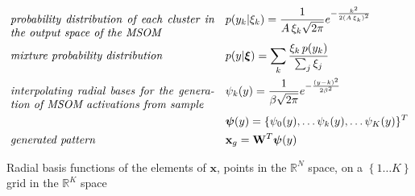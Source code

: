 \documentclass[a4paper]{article}
\begin{document}
\begin{align}
	& \emph{\parbox[t]{2.5in}{probability distribution of 
    each cluster in the output space of the MSOM}} && 
    p(y_k|\xi_k) = \frac{1}{A\,\xi_k\sqrt{2\pi}} 
    e^{-\frac{k^2}{2(A\,\xi_k)^2}}\nonumber\\
    & \emph{mixture probability distribution} && 
    p(y|\boldsymbol{\xi}) = \sum_k \frac{\xi_k\, p(y_k)}
    {\sum_j\xi_j}\nonumber\\
    & \emph{\parbox[t]{2.5in}{interpolating radial bases
    for the generation of MSOM activations from sample}} && 
    \psi_k(y) = \frac{1}{\beta\sqrt{2\pi}}
    e^{-\frac{(y-k)^2}{2\beta^2}}\nonumber\\
    & &&\boldsymbol{\psi}(y) = \{\psi_0(y),\dots\psi_k(y), 
    \dots\psi_K(y)\}^T \nonumber\\
    & \emph{generated pattern} &&
    \mathbf{x}_g = \mathbf{W}^T\boldsymbol{\psi}(y)\nonumber     
\end{align}

\IncMargin{1em}
\begin{algorithm}[H]
\DontPrintSemicolon
{}



\BlankLine

\BlankLine

 
\caption{Radial basis functions of the elements of $\mathbf{x}$, points in the $\mathbb{R}^{N}$ space, on a $\left\{1\dots K\right\}$ grid in the $\mathbb{R}^{K}$ space}\label{RadialBases}

\end{algorithm}
\DecMargin{1em}
\end{document}
